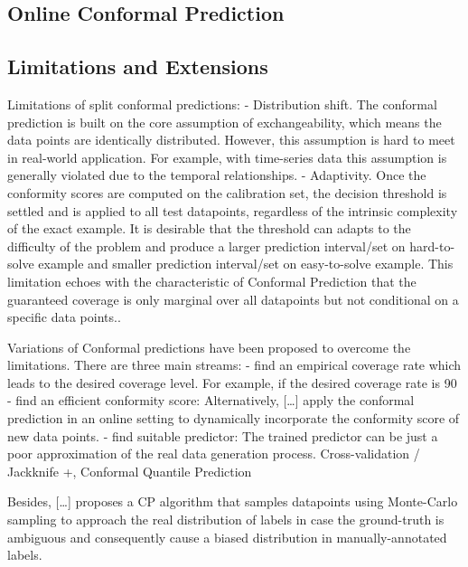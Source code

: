 \documentclass[a4paper,oneside,bibliography=totoc]{scrbook}
\begin{document}
\subsection{Online Conformal Prediction}

\subsection{Limitations and Extensions}
Limitations of split conformal predictions:
- Distribution shift. The conformal prediction is built on the core assumption of exchangeability, which means the data points are identically distributed. However, this assumption is hard to meet in real-world application. For example, with time-series data this assumption is generally violated due to the temporal relationships. 
- Adaptivity. Once the conformity scores are computed on the calibration set, the decision threshold is settled and is applied to all test datapoints, regardless of the intrinsic complexity of the exact example. It is desirable that the threshold can adapts to the difficulty of the problem and produce a larger prediction interval/set on hard-to-solve example and smaller prediction interval/set on easy-to-solve example. This limitation echoes with the characteristic of Conformal Prediction that the guaranteed coverage is only marginal over all datapoints but not conditional on a specific data points..

Variations of Conformal predictions have been proposed to overcome the limitations. There are three main streams:
- find an empirical coverage rate which leads to the desired coverage level. For example, if the desired coverage rate is 90%
- find an efficient conformity score: Alternatively, […] apply the conformal prediction in an online setting to dynamically incorporate the conformity score of new data points.
- find suitable predictor: The trained predictor can be just a poor approximation of the real data generation process.
Cross-validation / Jackknife +, Conformal Quantile Prediction

Besides, […] proposes a CP algorithm that samples datapoints using Monte-Carlo sampling to approach the real distribution of labels in case the ground-truth is ambiguous and consequently cause a biased distribution in manually-annotated labels.



\end{document}

